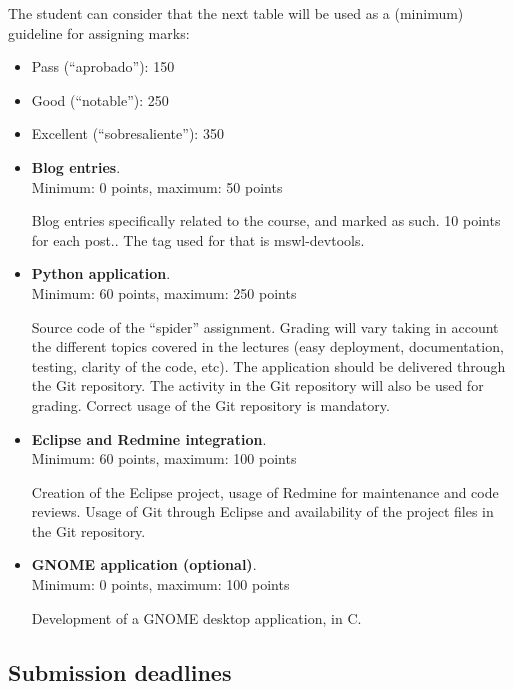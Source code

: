 \documentclass[a4paper]{article}
\begin{document}
The student can consider that the next table will be used as a
(minimum) guideline for assigning marks:

\begin{itemize}
\item Pass (``aprobado''): 150
\item Good (``notable''): 250
\item Excellent (``sobresaliente''): 350
\end{itemize}

\begin{itemize}
\item \textbf{Blog entries}. \\
  Minimum: 0 points, maximum: 50 points

  Blog entries specifically related to the course, and marked as
  such. 10 points for each post.. The tag used for that is mswl-devtools.

\item \textbf{Python application}. \\
  Minimum: 60 points, maximum: 250 points

Source code of the ``spider'' assignment. Grading will vary taking in
account the different topics covered in the lectures (easy deployment,
documentation, testing, clarity of the code, etc). The application
should be delivered through the Git repository. The activity in the
Git repository will also be used for grading. Correct usage of the Git
repository is mandatory.

\item \textbf{Eclipse and Redmine integration}. \\
  Minimum: 60 points, maximum: 100 points

Creation of the Eclipse project, usage of Redmine for maintenance and
code reviews. Usage of Git through Eclipse and availability of the
project files in the Git repository.


\item \textbf{GNOME application (optional)}. \\
  Minimum: 0 points, maximum: 100 points

Development of a GNOME desktop application, in C.

\end{itemize}

\subsection{Submission deadlines}
\end{document}
